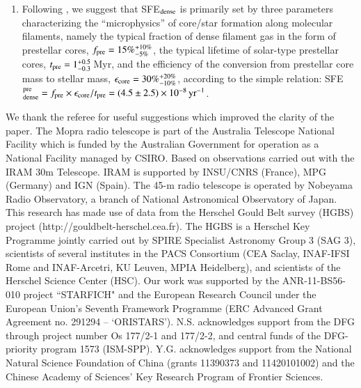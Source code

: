 \documentclass{aa}
\begin{document}
{{\begin{enumerate}
\item Following \citet{Andre14}, we suggest that  SFE$_{\rm dense}$ is primarily set by three parameters characterizing the ``microphysics'' of core/star formation along molecular filaments, 
namely the typical fraction of dense filament gas in the form of prestellar cores, $f_{\rm pre} = 15\%^{+10\%}_{-5\%}$, the typical lifetime of solar-type prestellar cores, $t_{\rm pre} = 1^{+0.5}_{-0.3}\, $Myr, and the efficiency of the conversion from prestellar core mass to stellar mass, $\epsilon_{\rm core} = 30\%^{+20\%}_{-10\%}$, according to the simple relation: SFE$_{\rm dense}^{\rm pre} = f_{\rm pre} \times \epsilon_{\rm core} / t_{\rm pre} = (4.5\pm2.5)\times10^{-8}\, {\rm yr}^{-1} $.

\end{enumerate}

\begin{acknowledgements}
We thank the referee for useful suggestions which improved the clarity of the paper. 
The Mopra radio telescope is part of the Australia Telescope National Facility which is funded by the Australian Government for operation as a National Facility managed by CSIRO. Based on observations carried out with the IRAM 30m Telescope. IRAM is supported by INSU/CNRS (France), MPG (Germany) and IGN (Spain). The 45-m radio telescope is operated by Nobeyama Radio Observatory, a branch of National Astronomical Observatory of Japan. 
This research has made use of data from the Herschel Gould Belt survey (HGBS) project (http://gouldbelt-herschel.cea.fr). The HGBS is a Herschel Key Programme jointly carried out by SPIRE Specialist Astronomy Group 3 (SAG 3), scientists of several institutes in the PACS Consortium (CEA Saclay, INAF-IFSI Rome and INAF-Arcetri, KU Leuven, MPIA Heidelberg), and scientists of the Herschel Science Center (HSC).
Our work was supported by the ANR-11-BS56-010 project ``STARFICH" and the European Research Council under the European Union's Seventh Framework Programme (ERC Advanced Grant Agreement no. 291294 --  `ORISTARS'). N.S. acknowledges support from the DFG through project number Os 177/2-1 and 177/2-2, and central funds of the DFG-priority program 1573 (ISM-SPP). Y.G. acknowledges support from the National Natural Science Foundation of China (grants 11390373 and 11420101002) and the Chinese Academy of Sciences’ Key Research Program of Frontier Sciences.

\end{acknowledgements}



}}
\end{document}
